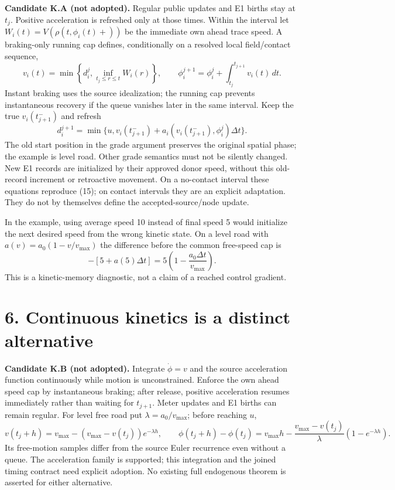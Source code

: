 \documentclass[11pt,a4paper]{article}
\begin{document}
\textbf{Candidate K.A (not adopted).} Regular public updates and E1 births
stay at $t_j$. Positive acceleration is refreshed only at those times.
Within the interval let $W_i(t)=V(\rho(t,\phi_i(t)+))$ be the immediate
own ahead trace speed. A braking-only running cap defines, conditionally on
a resolved local field/contact sequence,
\begin{equation}
 v_i(t)=\min\left\{d_i^j,\inf_{t_j\le r\le t}W_i(r)\right\},\qquad
 \phi_i^{j+1}=\phi_i^j+\int_{t_j}^{t_{j+1}}v_i(t)\,dt.
\end{equation}
Instant braking uses the source idealization; the running cap prevents
instantaneous recovery if the queue vanishes later in the same interval.
Keep the true $v_i(t_{j+1}^-)$ and refresh
\begin{equation}
 d_i^{j+1}=\min\{u,v_i(t_{j+1}^-)
       +a_i(v_i(t_{j+1}^-),\phi_i^j)\Delta t\}.
\end{equation}
The old start position in the grade argument preserves the original spatial
phase; the example is level road. Other grade semantics must not be silently
changed. New E1 records are initialized by their approved donor speed, without
this old-record increment or retroactive movement. On a no-contact interval
these equations reproduce (15); on contact intervals they are an explicit
adaptation. They do not by themselves define the accepted-source/node update.

In the example, using average speed 10 instead of final speed 5 would initialize
the next desired speed from the wrong kinetic state. On a level road with
$a(v)=a_0(1-v/v_{\max})$ the difference before the common free-speed cap is
\begin{equation}
 [10+a(10)\Delta t]-[5+a(5)\Delta t]
 =5\left(1-\frac{a_0\Delta t}{v_{\max}}\right).
\end{equation}
This is a kinetic-memory diagnostic, not a claim of a reached control gradient.

\newpage
\section*{6. Continuous kinetics is a distinct alternative}
\textbf{Candidate K.B (not adopted).} Integrate $\dot\phi=v$ and the source
acceleration function continuously while motion is unconstrained. Enforce the
own ahead speed cap by instantaneous braking; after release, positive
acceleration resumes immediately rather than waiting for $t_{j+1}$. Meter
updates and E1 births can remain regular. For level free road put
$\lambda=a_0/v_{\max}$; before reaching $u$,
\begin{equation}
 v(t_j+h)=v_{\max}-(v_{\max}-v(t_j))e^{-\lambda h},\qquad
 \phi(t_j+h)-\phi(t_j)
 =v_{\max}h-\frac{v_{\max}-v(t_j)}{\lambda}(1-e^{-\lambda h}).
\end{equation}
Its free-motion samples differ from the source Euler recurrence even without
a queue. The acceleration family is supported; this integration and the
joined timing contract need explicit adoption. No existing full endogenous
theorem is asserted for either alternative.
\end{document}
